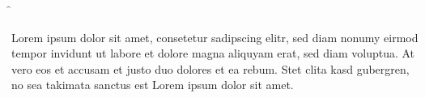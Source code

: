\documentclass{article}
\begin{document}
\iffalse
Commented stuff
Another \ifstuff here \fi
\ifasd \fi \f \fii

Lorem ipsum dolor sit amet, consetetur sadipscing elitr, sed diam nonumy eirmod
tempor invidunt ut labore et dolore magna aliquyam erat, sed diam voluptua. At
vero eos et accusam et justo duo dolores et ea rebum. Stet clita kasd
gubergren, no sea takimata sanctus est Lorem ipsum dolor sit amet.
\fi
\end{document}
